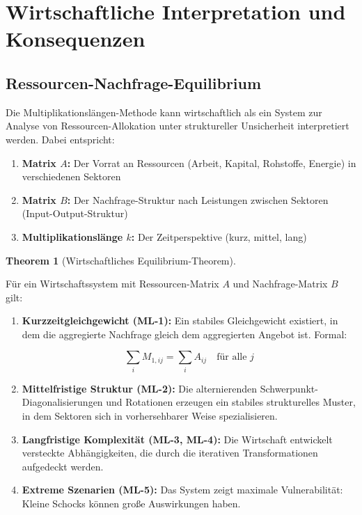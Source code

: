 \documentclass[a4paper,12pt]{article}
\theoremstyle{definition}
\newtheorem{theorem}{Theorem}
\begin{document}
\section{Wirtschaftliche Interpretation und Konsequenzen}

\subsection{Ressourcen-Nachfrage-Equilibrium}

Die Multiplikationslängen-Methode kann wirtschaftlich als ein System zur Analyse von Ressourcen-Allokation unter struktureller Unsicherheit interpretiert werden. Dabei entspricht:

\begin{enumerate}
\item \textbf{Matrix $A$:} Der Vorrat an Ressourcen (Arbeit, Kapital, Rohstoffe, Energie) in verschiedenen Sektoren
\item \textbf{Matrix $B$:} Der Nachfrage-Struktur nach Leistungen zwischen Sektoren (Input-Output-Struktur)
\item \textbf{Multiplikationslänge $k$:} Der Zeitperspektive (kurz, mittel, lang)
\end{enumerate}

\begin{theorem}[Wirtschaftliches Equilibrium-Theorem]
\label{thm:econ_equilibrium}

Für ein Wirtschaftssystem mit Ressourcen-Matrix $A$ und Nachfrage-Matrix $B$ gilt:

\begin{enumerate}

\item \textbf{Kurzzeitgleichgewicht (ML-1):} Ein stabiles Gleichgewicht existiert, in dem die aggregierte Nachfrage gleich dem aggregierten Angebot ist. Formal:

\begin{equation}
\sum_i M_{1,ij} = \sum_i A_{ij} \quad \text{für alle } j
\end{equation}

\item \textbf{Mittelfristige Struktur (ML-2):} Die alternierenden Schwerpunkt-Diagonalisierungen und Rotationen erzeugen ein stabiles strukturelles Muster, in dem Sektoren sich in vorhersehbarer Weise spezialisieren.

\item \textbf{Langfristige Komplexität (ML-3, ML-4):} Die Wirtschaft entwickelt versteckte Abhängigkeiten, die durch die iterativen Transformationen aufgedeckt werden.

\item \textbf{Extreme Szenarien (ML-5):} Das System zeigt maximale Vulnerabilität: Kleine Schocks können große Auswirkungen haben.

\end{enumerate}

\end{theorem}
\end{document}
